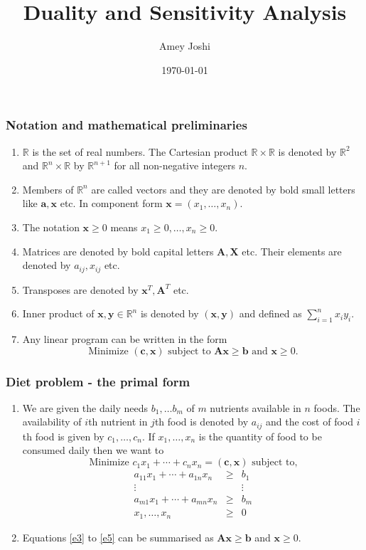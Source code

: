 \documentclass{beamer}
\title{Duality and Sensitivity Analysis}
\author{Amey Joshi}
\date{\today}
\begin{document}
\begin{frame}
\titlepage
\end{frame}

\begin{frame}
\frametitle{Notation and mathematical preliminaries}
\begin{enumerate}
\item $\mathbb{R}$ is the set of real numbers. The Cartesian product $\mathbb{R}
\times \mathbb{R}$ is denoted by $\mathbb{R}^2$ and $\mathbb{R}^n \times 
\mathbb{R}$ by $\mathbb{R}^{n+1}$ for all non-negative integers $n$.
\item Members of $\mathbb{R}^n$ are called vectors and they are denoted by bold
small letters like $\bm{a}, \bm{x}$ etc. In component form $\bm{x} = (x_1, 
\ldots, x_n)$.
\item The notation $\bm{x} \ge 0$ means $x_1 \ge 0, \ldots, x_n \ge 0$.
\item Matrices are denoted by bold capital letters $\bm{A}, \bm{X}$ etc. Their 
elements are denoted by $a_{ij}, x_{ij}$ etc.
\item Transposes are denoted by $\bm{x}^T, \bm{A}^T$ etc.
\item Inner product of $\bm{x}, \bm{y} \in \mathbb{R}^n$ is denoted by 
$(\bm{x}, \bm{y})$ and defined as $\sum_{i=1}^n x_iy_i$.
\item Any linear program can be written in the form
\begin{equation}\label{e1}
\text{Minimize } (\bm{c}, \bm{x}) \text{ subject to } \bm{A}\bm{x} \ge \bm{b}
\text{ and } \bm{x} \ge 0.
\end{equation}
\end{enumerate}
\end{frame}

\begin{frame}
\frametitle{Diet problem - the primal form}
\begin{enumerate}
\item We are given the daily needs $b_1, 
\ldots b_m$ of $m$ nutrients available in $n$ foods. The availability of $i$th
nutrient in $j$th food is denoted by $a_{ij}$ and the cost of food $i$th food
is given by $c_1, \ldots, c_n$. If $x_1, \ldots, x_n$ is the quantity of food
to be consumed daily then we want to
\begin{equation}\label{e2}
\text{Minimize } c_1x_1 + \cdots + c_nx_n = (\bm{c}, \bm{x}) \text{ subject to,}
\end{equation}
\begin{eqnarray}
a_{11}x_1 + \cdots + a_{1n}x_n &\ge& b_1 \label{e3} \\
\vdots & & \vdots \nonumber \\
a_{m1}x_1 + \cdots + a_{mn}x_n &\ge& b_m \label{e4} \\
x_1, \ldots, x_n &\ge& 0 \label{e5}
\end{eqnarray}
\item Equations \eqref{e3} to \eqref{e5} can be summarised as $\bm{A}\bm{x} \ge
\bm{b}$ and $\bm{x} \ge 0$.
\end{enumerate}
\end{frame}
\end{document}
